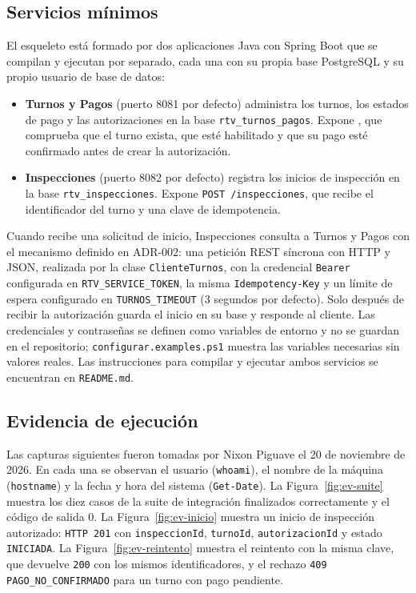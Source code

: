 \documentclass[11pt,a4paper]{article}
\begin{document}
	\subsection{Servicios mínimos}
	El esqueleto está formado por dos aplicaciones Java con Spring Boot que se compilan y ejecutan por separado, cada una con su propia base PostgreSQL y su propio usuario de base de datos:
	
	\begin{itemize}[nosep]
		\item \textbf{Turnos y Pagos} (puerto 8081 por defecto) administra los turnos, los estados de pago y las autorizaciones en la base \texttt{rtv\_turnos\_pagos}. Expone , que comprueba que el turno exista, que esté habilitado y que su pago esté confirmado antes de crear la autorización.
		\item \textbf{Inspecciones} (puerto 8082 por defecto) registra los inicios de inspección en la base \texttt{rtv\_inspecciones}. Expone \texttt{POST /inspecciones}, que recibe el identificador del turno y una clave de idempotencia.
	\end{itemize}
	
	Cuando recibe una solicitud de inicio, Inspecciones consulta a Turnos y Pagos con el mecanismo definido en ADR-002: una petición REST síncrona con HTTP y JSON, realizada por la clase \texttt{ClienteTurnos}, con la credencial \texttt{Bearer} configurada en \texttt{RTV\_SERVICE\_TOKEN}, la misma \texttt{Idempotency-Key} y un límite de espera configurado en \texttt{TURNOS\_TIMEOUT} (3 segundos por defecto). Solo después de recibir la autorización guarda el inicio en su base y responde al cliente. Las credenciales y contraseñas se definen como variables de entorno y no se guardan en el repositorio; \texttt{configurar.examples.ps1} muestra las variables necesarias sin valores reales. Las instrucciones para compilar y ejecutar ambos servicios se encuentran en \texttt{README.md}.
	
	\subsection{Evidencia de ejecución}
	Las capturas siguientes fueron tomadas por Nixon Piguave el 20 de noviembre de 2026. En cada una se observan el usuario (\texttt{whoami}), el nombre de la máquina (\texttt{hostname}) y la fecha y hora del sistema (\texttt{Get-Date}). La Figura~\ref{fig:ev-suite} muestra los diez casos de la suite de integración finalizados correctamente y el código de salida 0. La Figura~\ref{fig:ev-inicio} muestra un inicio de inspección autorizado: \texttt{HTTP 201} con \texttt{inspeccionId}, \texttt{turnoId}, \texttt{autorizacionId} y estado \texttt{INICIADA}. La Figura~\ref{fig:ev-reintento} muestra el reintento con la misma clave, que devuelve \texttt{200} con los mismos identificadores, y el rechazo \texttt{409 PAGO\_NO\_CONFIRMADO} para un turno con pago pendiente.
	
\end{document}

